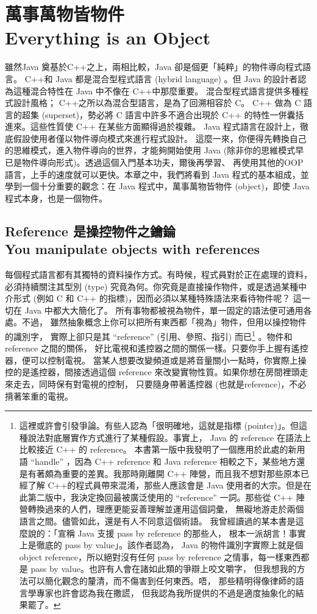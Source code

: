 \chapter{萬事萬物皆物件 \\
Everything is an Object}


雖然Java 奠基於C++之上，兩相比較，Java 卻是個更「純粹」的物件導向程式語言。
C++和 Java 都是混合型程式語言 (hybrid language) 。但 Java
的設計者認為這種混合特性在 Java 中不像在 C++中那麼重要。
混合型程式語言提供多種程式設計風格； C++之所以為混合型語言，是為了回溯相容於 C。
C++ 做為 C 語言的超集 (superset)，勢必將 C 語言中許多不適合出現於 C++
的特性一併囊括進來。這些性質使 C++ 在某些方面顯得過於複雜。
Java 程式語言在設計上，徹底假設使用者僅以物件導向模式來進行程式設計。
這麼一來，你便得先轉換自己的思維模式，進入物件導向的世界，才能夠開始使用
Java (除非你的思維模式早已是物件導向形式)。透過這個入門基本功夫，爾後再學習、
再使用其他的OOP 語言，上手的速度就可以更快。本章之中，我們將看到 Java
程式的基本組成，並學到一個十分重要的觀念：在 Java 程式中，萬事萬物皆物件
(object)，即使 Java 程式本身，也是一個物件。
\section[Reference 是操控物件之鑰錀]{Reference 是操控物件之鑰錀 \\
You manipulate objects with references}
每個程式語言都有其獨特的資料操作方式。有時候，程式員對於正在處理的資料，
必須持續關注其型別 (type) 究竟為何。你究竟是直接操作物件，或是透過某種中介形式
(例如 C 和 C++ 的指標)，因而必須以某種特殊語法來看待物件呢？
這一切在 Java 中都大大簡化了。
所有事物都被視為物件，單一固定的語法便可通用各處。不過，
雖然抽象概念上你可以把所有東西都「視為」物件，但用以操控物件的識別字，
實際上卻只是其 ``reference'' (引用、參照、指引)
而已\footnote{這裡或許會引發爭論。有些人認為「很明確地，這就是指標
(pointer)」。但這種說法對底層實作方式進行了某種假設。事實上， Java 的
reference 在語法上比較接近 C++ 的 reference。
本書第一版中我發明了一個應用於此處的新用語 ``handle'' ，因為 C++ reference
和 Java reference 相較之下，某些地方還是有著頗為重要的差異。我那時剛離開
C++ 陣營，而且我不想對那些原本已經了解 C++的程式員帶來混淆，那些人應該會是
Java 使用者的大宗。但是在此第二版中，我決定換回最被廣泛使用的 ``reference''
一詞。那些從 C++ 陣營轉換過來的人們，理應更能妥善理解並運用這個詞彙，
無礙地游走於兩個語言之間。儘管如此，還是有人不同意這個術語。
我曾經讀過的某本書是這麼說的：「宣稱 Java 支援 pass by reference 的那些人，
根本一派胡言！事實上是徹底的 pass by value」。該作者認為， Java
的物件識別字實際上就是個 object reference，所以絕對沒有任何 pass by reference
之情事，每一樣東西都是 pass by value。也許有人會在諸如此類的爭辯上咬文嚼字，
但我想我的方法可以簡化觀念的釐清，而不傷害到任何東西。唔，
那些精明得像律師的語言學專家也許會認為我在撒謊，
但我認為我所提供的不過是適度抽象化的結果罷了。} 。物件和 reference 之間的關係，
好比電視和遙控器之間的關係一樣。只要你手上握有遙控器，便可以控制電視。
當某人想要改變頻道或是將音量關小一點時，你實際上操控的是遙控器，間接透過這個
reference 來改變實物性質。如果你想在房間裡頭走來走去，同時保有對電視的控制，
只要隨身帶著遙控器 (也就是reference)，不必揹著笨重的電視。

